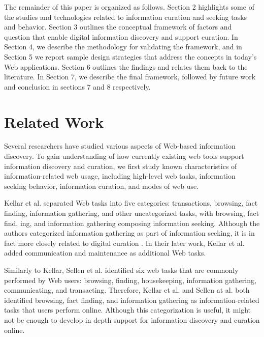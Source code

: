 \documentclass{casconpaper}
\begin{document}
{The remainder of this paper is organized as follows. Section 2 highlights some of the studies and technologies related to information curation and seeking tasks and behavior. Section 3 outlines the conceptual framework of factors and question that enable digital information discovery and support curation. In Section 4, we describe the methodology for validating the framework, and in Section 5 we  report sample design strategies that address the concepts in today's Web applications. Section 6 outlines the findings and relates them back to the literature. In Section 7, we describe the final framework, followed by future work and conclusion in sections 7 and 8 respectively.

} %


{\section{Related Work}

Several researchers have studied various aspects of Web-based  information discovery. To gain understanding of how currently existing web tools support information discovery and curation, we first study known characteristics of information-related web usage, including high-level web tasks, information seeking behavior, information curation, and modes of web use. 

Kellar et al. \cite{kellar2006} separated Web tasks into five categories: transactions, browsing, fact finding, information gathering, and other uncategorized tasks, with browsing, fact find, ing, and information gathering composing information seeking. Although the authors categorized information gathering as part of information seeking, it is in fact more closely related to digital curation \cite{beagrie, wittaker}. In their later work, Kellar et al. \cite{kellar2007} added communication and maintenance as additional Web tasks. 

Similarly to Kellar, Sellen et al. \cite{sellen} identified six web tasks that are commonly performed by Web users: browsing, finding, housekeeping, information gathering, communicating, and transacting. Therefore, Kellar et al. and Sellen at al. both identified browsing, fact finding, and information gathering as information-related tasks that users perform online. Although this categorization is useful, it might not be enough to develop in depth support for information discovery and curation online. 

}
\end{document}
